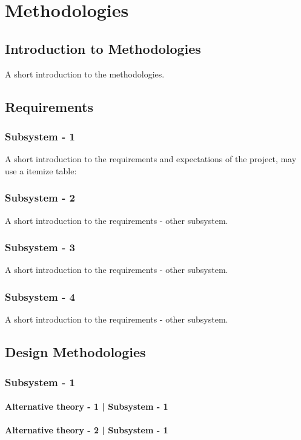 \chapter{Methodologies}
\label{chapter:methodologies}
\section{Introduction to Methodologies}
A short introduction to the methodologies.

\section{Requirements}
\subsection{Subsystem - 1}
A short introduction to the requirements and expectations of the project, may use a itemize table:

\subsection{Subsystem - 2}
A short introduction to the requirements - other subsystem.

\subsection{Subsystem - 3}
A short introduction to the requirements - other subsystem.

\subsection{Subsystem - 4}
A short introduction to the requirements - other subsystem.


\newpage
\section{Design Methodologies}

\subsection{Subsystem - 1}\label{Subsystem - 1}
\subsubsection{Alternative theory - 1 | Subsystem - 1}
\subsubsection{Alternative theory - 2 | Subsystem - 1}
